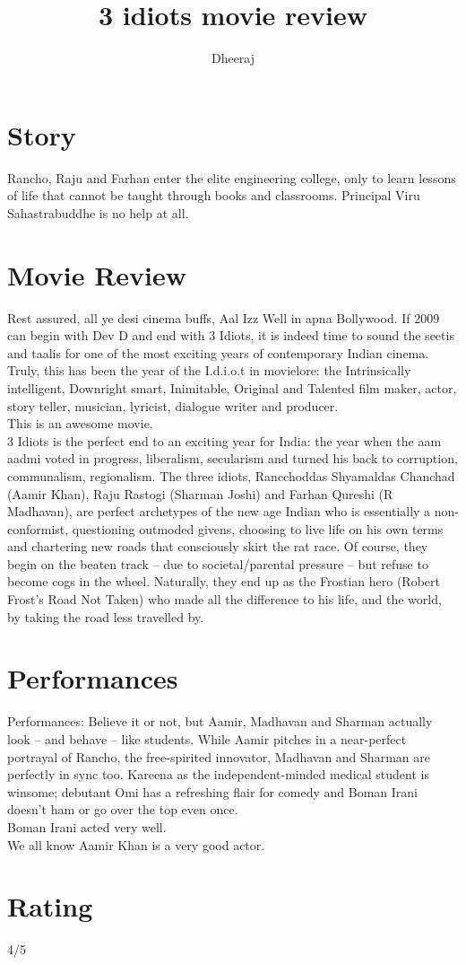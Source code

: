 \documentclass[a4paper,10pt]{article}
\title{3 idiots movie review}
\author{Dheeraj}
\begin{document}
\maketitle

\section{Story}
 Rancho, Raju and Farhan enter the elite engineering college, only to learn lessons of life that cannot be taught through books and classrooms. Principal Viru Sahastrabuddhe is no help at all.

\section{Movie Review}
Rest assured, all ye desi cinema buffs, Aal Izz Well in apna Bollywood. If 2009 can begin with Dev D and end with 3 Idiots, it is indeed time to sound the seetis and taalis for one of the most exciting years of contemporary Indian cinema. Truly, this has been the year of the I.d.i.o.t in movielore: the Intrinsically intelligent, Downright smart, Inimitable, Original and Talented film maker, actor, story teller, musician, lyricist, dialogue writer and producer.\\

This is an awesome movie.\\

3 Idiots is the perfect end to an exciting year for India: the year when the aam aadmi voted in progress, liberalism, secularism and turned his back to corruption, communalism, regionalism. The three idiots, Rancchoddas Shyamaldas Chanchad (Aamir Khan), Raju Rastogi (Sharman Joshi) and Farhan Qureshi (R Madhavan), are perfect archetypes of the new age Indian who is essentially a non-conformist, questioning outmoded givens, choosing to live life on his own terms and chartering new roads that consciously skirt the rat race. Of course, they begin on the beaten track -- due to societal/parental pressure -- but refuse to become cogs in the wheel. Naturally, they end up as the Frostian hero (Robert Frost's Road Not Taken) who made all the difference to his life, and the world, by taking the road less travelled by.

\section{Performances}
Performances: Believe it or not, but Aamir, Madhavan and Sharman actually look -- and behave -- like students. While Aamir pitches in a near-perfect portrayal of Rancho, the free-spirited innovator, Madhavan and Sharman are perfectly in sync too. Kareena as the independent-minded medical student is winsome; debutant Omi has a refreshing flair for comedy and Boman Irani doesn't ham or go over the top even once.\\
Boman Irani acted very well.\\

We all know Aamir Khan is a very good actor.\\

\section{Rating}
4/5
\end{document}
